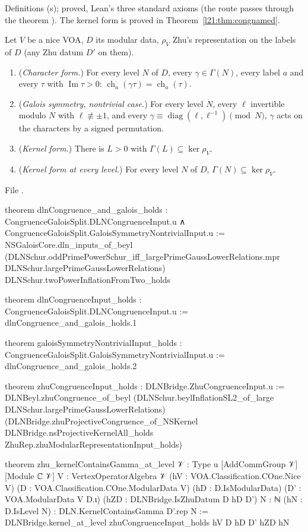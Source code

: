 \begin{status}
Definitions (s);  proved, Lean's three standard axioms (the route passes through the theorem
). The kernel form is proved in Theorem~\ref{l21:thm:congnamed}.
\end{status}

\begin{theorem}\label{l21:thm:congnamed}
Let $V$ be a nice VOA, $D$ its modular data, $\rho_V$ Zhu's representation on the labels of $D$ (any Zhu datum $D'$ on them).
\begin{enumerate}
\item (\emph{Character form.}) For every level $N$ of $D$, every $\gamma\in\Gamma(N)$, every label $a$ and every $\tau$ with
  $\operatorname{Im}\tau>0$: $\operatorname{ch}_a(\gamma\tau)=\operatorname{ch}_a(\tau)$.
\item (\emph{Galois symmetry, nontrivial case.}) For every level $N$, every $\ell$ invertible modulo $N$ with
  $\ell\not\equiv\pm1$, and every $\gamma\equiv\operatorname{diag}(\ell,\ell^{-1})\pmod N$, $\gamma$ acts on the characters by a
  signed permutation.
\item (\emph{Kernel form.}) There is $L>0$ with $\Gamma(L)\subseteq\ker\rho_V$.
\item (\emph{Kernel form at every level.}) For every level $N$ of $D$, $\Gamma(N)\subseteq\ker\rho_V$.
\end{enumerate}
\end{theorem}
\noindent File .
\begin{leancode}
theorem dlnCongruence_and_galois_holds :
    CongruenceGaloisSplit.DLNCongruenceInput.{u} ∧
      CongruenceGaloisSplit.GaloisSymmetryNontrivialInput.{u} :=
  NSGaloisCore.dln_inputs_of_beyl
    (DLNSchur.oddPrimePowerSchur_iff_largePrimeGaussLowerRelations.mpr
      DLNSchur.largePrimeGaussLowerRelations)
    DLNSchur.twoPowerInflationFromTwo_holds

theorem dlnCongruenceInput_holds : CongruenceGaloisSplit.DLNCongruenceInput.{u} :=
  dlnCongruence_and_galois_holds.1

theorem galoisSymmetryNontrivialInput_holds :
    CongruenceGaloisSplit.GaloisSymmetryNontrivialInput.{u} :=
  dlnCongruence_and_galois_holds.2

theorem zhuCongruenceInput_holds : DLNBridge.ZhuCongruenceInput.{u} :=
  DLNBeyl.zhuCongruence_of_beyl
    (DLNSchur.beylInflationSL2_of_large DLNSchur.largePrimeGaussLowerRelations)
    (DLNBridge.zhuProjectiveCongruence_of_NSKernel DLNBridge.nsProjectiveKernelAll_holds
      ZhuRep.zhuModularRepresentationInput_holds)

theorem zhu_kernelContainsGamma_at_level {𝒱 : Type u} [AddCommGroup 𝒱] [Module ℂ 𝒱]
    {V : VertexOperatorAlgebra 𝒱} (hV : VOA.Classification.COne.Nice V)
    (D : VOA.Classification.COne.ModularData V) (hD : D.IsModularData)
    (D' : VOA.ModularData V D.ι) (hZD : DLNBridge.IsZhuDatum D hD D') {N : ℕ}
    (hN : D.IsLevel N) : DLN.KernelContainsGamma D'.rep N :=
  DLNBridge.kernel_at_level zhuCongruenceInput_holds hV D hD D' hZD hN
\end{leancode}

